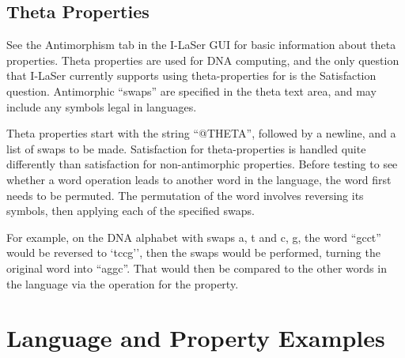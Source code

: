 \documentclass{article}
\begin{document}
\subsection{Theta Properties}
See the Antimorphism tab in the I-LaSer GUI for basic information about theta properties.
Theta properties are used for DNA computing, and the only question that I-LaSer currently supports using theta-properties for is the Satisfaction question.
Antimorphic ``swaps'' are specified in the theta text area, and may include any symbols legal in languages.

Theta properties start with the string ``@THETA'', followed by a newline, and a list of swaps to be made.
Satisfaction for theta-properties is handled quite differently than satisfaction for non-antimorphic properties.
Before testing to see whether a word operation leads to another word in the language, the word first needs to be permuted.
The permutation of the word involves reversing its symbols, then applying each of the specified swaps.

For example, on the DNA alphabet with swaps {a, t} and {c, g}, the word ``gcct'' would be reversed to `tccg'', then the swaps would be performed, turning the original word into ``aggc''.
That would then be compared to the other words in the language via the operation for the property.
\pagebreak
\section{Language and Property Examples}
\end{document}
